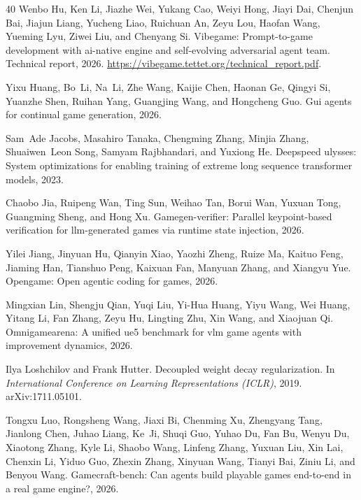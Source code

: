 \begin{thebibliography}{40}
Wenbo Hu, Ken Li, Jiazhe Wei, Yukang Cao, Weiyi Hong, Jiayi Dai, Chenjun Bai, Jiajun Liang, Yucheng Liao, Ruichuan An, Zeyu Lou, Haofan Wang, Yueming Lyu, Ziwei Liu, and Chenyang Si.
\newblock Vibegame: Prompt-to-game development with ai-native engine and self-evolving adversarial agent team.
\newblock Technical report, 2026. \url{https://vibegame.tettet.org/technical_report.pdf}.

Yixu Huang, Bo~Li, Na~Li, Zhe Wang, Kaijie Chen, Haonan Ge, Qingyi Si, Yuanzhe Shen, Ruihan Yang, Guangjing Wang, and Hongcheng Guo.
\newblock Gui agents for continual game generation, 2026.

Sam~Ade Jacobs, Masahiro Tanaka, Chengming Zhang, Minjia Zhang, Shuaiwen~Leon Song, Samyam Rajbhandari, and Yuxiong He.
\newblock Deepspeed ulysses: System optimizations for enabling training of extreme long sequence transformer models, 2023.

Chaobo Jia, Ruipeng Wan, Ting Sun, Weihao Tan, Borui Wan, Yuxuan Tong, Guangming Sheng, and Hong Xu.
\newblock Gamegen-verifier: Parallel keypoint-based verification for llm-generated games via runtime state injection, 2026.

Yilei Jiang, Jinyuan Hu, Qianyin Xiao, Yaozhi Zheng, Ruize Ma, Kaituo Feng, Jiaming Han, Tianshuo Peng, Kaixuan Fan, Manyuan Zhang, and Xiangyu Yue.
\newblock Opengame: Open agentic coding for games, 2026.

Mingxian Lin, Shengju Qian, Yuqi Liu, Yi-Hua Huang, Yiyu Wang, Wei Huang, Yitang Li, Fan Zhang, Zeyu Hu, Lingting Zhu, Xin Wang, and Xiaojuan Qi.
\newblock Omnigamearena: A unified ue5 benchmark for vlm game agents with improvement dynamics, 2026.

Ilya Loshchilov and Frank Hutter.
\newblock Decoupled weight decay regularization.
\newblock In \emph{International Conference on Learning Representations (ICLR)}, 2019. arXiv:1711.05101.

Tongxu Luo, Rongsheng Wang, Jiaxi Bi, Chenming Xu, Zhengyang Tang, Jianlong Chen, Juhao Liang, Ke~Ji, Shuqi Guo, Yuhao Du, Fan Bu, Wenyu Du, Xiaotong Zhang, Kyle Li, Shaobo Wang, Linfeng Zhang, Yuxuan Liu, Xin Lai, Chenxin Li, Yiduo Guo, Zhexin Zhang, Xinyuan Wang, Tianyi Bai, Ziniu Li, and Benyou Wang.
\newblock Gamecraft-bench: Can agents build playable games end-to-end in a real game engine?, 2026.


\end{thebibliography}
